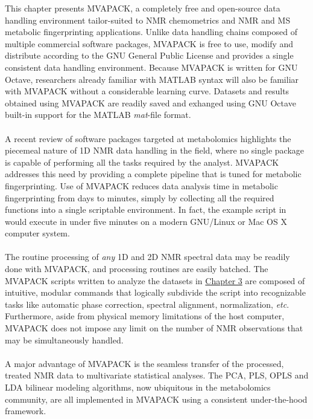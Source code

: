 \begin{doublespace}
This chapter presents MVAPACK, a completely free and open-source data handling
environment tailor-suited to NMR chemometrics and \hnmr{} NMR and MS metabolic
fingerprinting applications. Unlike data handling chains composed of multiple
commercial software packages, MVAPACK is free to use, modify and distribute
according to the GNU General Public License \cite{gpl3} and provides a single
consistent data handling environment. Because MVAPACK is written for GNU
Octave, researchers already familiar with MATLAB syntax will also be familiar
with MVAPACK without a considerable learning curve. Datasets and results
obtained using MVAPACK are readily saved and exhanged using GNU Octave built-in
support for the MATLAB {\it mat}-file format.
\\\\
A recent review \cite{izquierdo:pnmrs2011} of software packages targeted at
metabolomics highlights the piecemeal nature of 1D \hnmr{} NMR data handling
in the field, where no single package is capable of performing all the tasks
required by the analyst. MVAPACK addresses this need by providing a complete
pipeline that is tuned for metabolic fingerprinting. Use of MVAPACK reduces
data analysis time in metabolic fingerprinting from days to minutes, simply
by collecting all the required functions into a single scriptable environment.
In fact, the example script in  would execute in under
five minutes on a modern GNU/Linux or Mac OS X computer system.
\\\\
The routine processing of {\it any} 1D and 2D NMR spectral data may be readily
done with MVAPACK, and processing routines are easily batched. The MVAPACK
scripts written to analyze the datasets in \hyperlink{chapter.3}{Chapter 3}
are composed of intuitive, modular commands that logically subdivide the script
into recognizable tasks like automatic phase correction, spectral alignment,
normalization, {\it etc}. Furthermore, aside from physical memory limitations
of the host computer, MVAPACK does not impose any limit on the number of NMR
observations that may be simultaneously handled.
\\\\
A major advantage of MVAPACK is the seamless transfer of the processed, treated
NMR data to multivariate statistical analyses. The PCA, PLS, OPLS and LDA
bilinear modeling algorithms, now ubiquitous in the metabolomics community,
are all implemented in MVAPACK using a consistent under-the-hood framework.

\end{doublespace}
